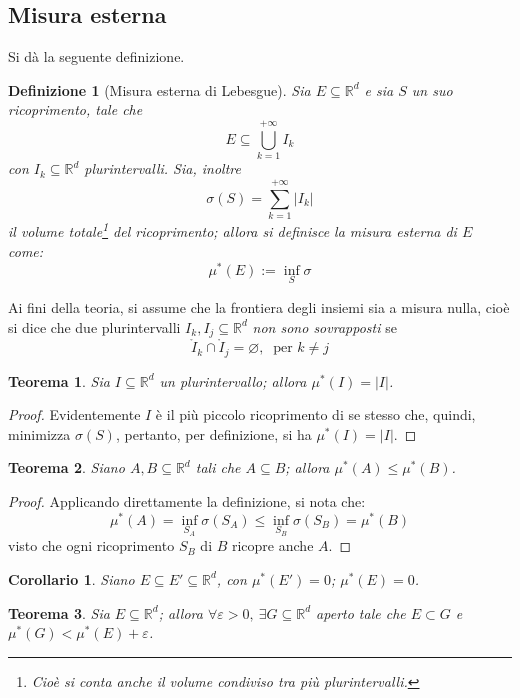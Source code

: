 \documentclass[11pt]{article}
\theoremstyle{style}
\newtheorem{definizione}{Definizione}[section]
\newtheorem{teorema}{Teorema}[section]
\newtheorem{corollario}{Corollario}[teorema]
\numberwithin{equation}{subsection}
\begin{document}
	\subsection{Misura esterna}
	Si d\`a la seguente definizione.
	\begin{definizione}
		[Misura esterna di Lebesgue]
	Sia $E \subseteq \mathbb{R}^d$ e sia $S$ un suo ricoprimento, tale che
	\[
	E \subseteq \bigcup_{k=1} ^{+\infty} I_k
	\] 
	con $I_k \subseteq \mathbb{R}^d$ plurintervalli. Sia, inoltre
	\[
	\sigma (S) = \sum_{k=1}^{+\infty} \lvert I_k \rvert 
	\] 
	il volume totale\footnote{Cio\`e si conta anche il volume condiviso tra pi\`u plurintervalli.} del ricoprimento; allora si definisce la \textit{misura esterna} di $E$ come:
	\[
	\mu^* (E) := \inf_S \sigma 
	\] 
	\end{definizione}
Ai fini della teoria, si assume che la frontiera degli insiemi sia a misura nulla, cio\`e si dice che due plurintervalli $I_k, I_j \subseteq \mathbb{R}^d$ \textit{non sono sovrapposti} se
\[
	\mathring{I}_k \cap \mathring{I}_j = \varnothing, \ \text{ per } k \neq j
\] 
\begin{teorema}
	Sia $I \subseteq \mathbb{R}^d$ un plurintervallo; allora $\mu^* (I) = \lvert I \rvert $.
\end{teorema}
	\begin{proof}
		Evidentemente $I$ \`e il pi\`u piccolo ricoprimento di se stesso che, quindi, minimizza $\sigma (S)$, pertanto, per definizione, si ha $\mu^* (I) = \lvert I \rvert $.
	\end{proof}
\begin{teorema}
	Siano $A,B \subseteq \mathbb{R}^d$ tali che $A \subseteq B$; allora $\mu^* (A) \le \mu^* (B)$.
\end{teorema}
	\begin{proof}
		Applicando direttamente la definizione, si nota che:
		\[
		\mu^* (A) = \inf_{S_A} \sigma (S_A) \le \inf_{S_B} \sigma (S_B) = \mu^* (B)  
		\] 
		visto che ogni ricoprimento $S_B$ di $B$ ricopre anche $A$.
	\end{proof}
\begin{corollario}
	Siano $E \subseteq E' \subseteq \mathbb{R}^d$, con $\mu^* (E') = 0$; $\mu^* (E) = 0$.
\end{corollario}
\begin{teorema}
	Sia $E \subseteq \mathbb{R}^d$; allora $\forall \varepsilon >0, \ \exists G \subseteq \mathbb{R}^d$ aperto tale che $E \subset G$ e $\mu^* (G) < \mu^* (E) + \varepsilon $.
\end{teorema}
\end{document}
